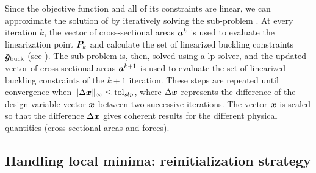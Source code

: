 Since the objective function and all of its constraints are linear, we can approximate the solution of  by iteratively solving the sub-problem . At every iteration $k$, the vector of cross-sectional areas $\bm{a}^k$ is used to evaluate the linearization point $\bm{P}_{k}$ and calculate the set of linearized buckling constraints $\bm{\tilde{g}}_{\textrm{buck}}$ (see ). The sub-problem  is, then, solved using a \gls{lp} solver, and the updated vector of cross-sectional areas $\bm{a}^{k+1}$ is used to evaluate the set of linearized buckling constraints of the $k+1$ iteration. These steps are repeated until convergence \ie when $\lVert\Delta \bm{x}\rVert_\infty\leq \text{tol}_{slp}$, where $\Delta \bm{x}$ represents the difference of the design variable vector $\bm{x}$ between two successive iterations. The vector $\bm{x}$ is scaled so that the difference $\Delta \bm{x}$ gives coherent results for the different physical quantities (cross-sectional areas and forces).

\subsection{Handling local minima: reinitialization strategy}
\label{sec:04_reinit}

